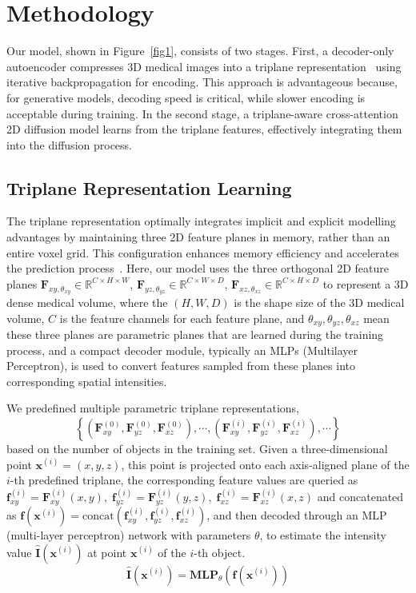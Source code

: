 \documentclass[letterpaper]{article} %
\begin{document}
\section{Methodology}
Our model, shown in Figure~\ref{fig1}, consists of two stages. First, a decoder-only autoencoder compresses 3D medical images into a triplane representation~\cite{chan2022efficient} using iterative backpropagation for encoding. This approach is advantageous because, for generative models, decoding speed is critical, while slower encoding is acceptable during training. In the second stage, a triplane-aware cross-attention 2D diffusion model learns from the triplane features, effectively integrating them into the diffusion process.

\subsection{Triplane Representation Learning}
The triplane representation optimally integrates implicit and explicit modelling advantages by maintaining three 2D feature planes in memory, rather than an entire voxel grid. This configuration enhances memory efficiency and accelerates the prediction process~\cite{chan2022efficient}. Here, our model uses the three orthogonal 2D feature planes $\mathbf{F}_{xy, \theta_{xy}} \in \mathbb{R}^{C \times H \times W}$, $\mathbf{F}_{yz, \theta_{yz}} \in \mathbb{R}^{C \times W \times D}$, $\mathbf{F}_{xz, \theta_{xz}} \in \mathbb{R}^{C \times H \times D}$  to represent a 3D dense medical volume, where the $(H,W,D)$ is the shape size of the 3D medical volume, $C$ is the feature channels for each feature plane, and $\theta_{xy}, \theta_{yz}, \theta_{xz}$ mean these three planes are parametric planes that are learned during the training process, and a compact decoder module, typically an MLPs (Multilayer Perceptron), is used to convert features sampled from these planes into corresponding spatial intensities.

We predefined multiple parametric triplane representations, 
$$\left\{
\left(\mathbf{F}_{xy}^{(0)},\mathbf{F}_{yz}^{(0)}, \mathbf{F}_{xz}^{(0)}\right),\cdots,\left(\mathbf{F}_{xy}^{(i)},\mathbf{F}_{yz}^{(i)}, \mathbf{F}_{xz}^{(i)}\right),\cdots 
\right\}$$
based on the number of objects in the training set. Given a three-dimensional point $\mathbf{x}^{(i)}=(x, y, z)$, this point is projected onto each axis-aligned plane of the $i$-th predefined triplane, the corresponding feature values are queried as $\mathbf{f}_{xy}^{(i)}=\mathbf{F}^{(i)}_{xy}(x,y),\; \mathbf{f}_{yz}^{(i)}=\mathbf{F}^{(i)}_{yz}(y,z),\; \mathbf{f}_{xz}^{(i)}=\mathbf{F}^{(i)}_{xz}(x,z)$ and concatenated as $\mathbf{f}(\mathbf{x}^{(i)})=\text{concat}\left(\mathbf{f}_{xy}^{(i)},\mathbf{f}_{yz}^{(i)},\mathbf{f}_{xz}^{(i)}\right)$, and then decoded through an MLP (multi-layer perceptron) network with parameters $\theta$, to estimate the intensity value $\mathbf{\widehat{I}}(\mathbf{x}^{(i)})$ at point $\mathbf{x}^{(i)}$ of the $i$-th object. 
\begin{equation}
\mathbf{\widehat{I}}(\mathbf{x}^{(i)}) = \mathbf{\text{MLP}}_\theta(\mathbf{f}(\mathbf{x}^{(i)}))
\label{e0}
\end{equation}
\end{document}
